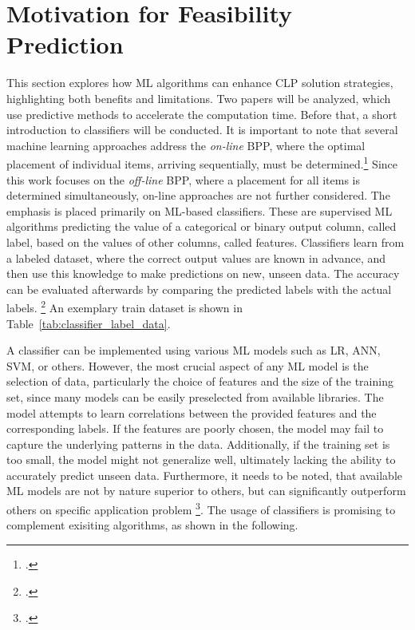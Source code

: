 \chapter{Motivation for Feasibility Prediction}
\label{sec:motivation_feasibility_prediction}
This section explores how \gls{ML} algorithms can enhance \gls{CLP} solution strategies,
highlighting both benefits and limitations. Two papers will be
analyzed, which use predictive methods to accelerate the computation time. Before that,
a short introduction to classifiers will be conducted. It is important to note that
several machine learning approaches address the \textit{on-line} \gls{BPP}, where the optimal placement
of individual items, arriving sequentially, must be determined.\footcite[cf.][p. 1]{ali_-line_2022}
Since this work focuses on the \textit{off-line} \gls{BPP}, where a placement for all items is determined
simultaneously, on-line approaches are not further considered. The emphasis is placed primarily
on \gls{ML}-based classifiers. These are supervised \gls{ML} algorithms predicting the
value of a categorical or binary output column, called label, based on the
values of other columns, called features. Classifiers learn from a labeled dataset,
where the correct output values are known in advance, and then use this knowledge to
make predictions on new, unseen data. The accuracy can be evaluated afterwards by comparing
the predicted labels with the actual labels. \footcite[cf.][]{kotsiantis_supervised_2007}
An exemplary train dataset is shown in Table~\ref{tab:classifier_label_data}.



A classifier can be implemented using various \gls{ML} models such as \gls{LR},
\gls{ANN}, \gls{SVM}, or others. However, the most crucial aspect of any
\gls{ML} model is the selection of data, particularly the choice of features and
the size of the training set, since many models can be easily preselected from available
libraries. The model attempts to learn correlations between the provided features
and the corresponding labels. If the features are poorly chosen, the model may fail
to capture the underlying patterns in the data. Additionally, if the training set
is too small, the model might not generalize well, ultimately lacking the ability
to accurately predict unseen data. Furthermore, it needs to be noted, that available
\gls{ML} models are not by nature superior to others, but can significantly outperform
others on specific application problem \footcite[cf.][pp. 250, 264]{kotsiantis_supervised_2007}.
The usage of classifiers is promising to complement exisiting algorithms, as shown in the following.

